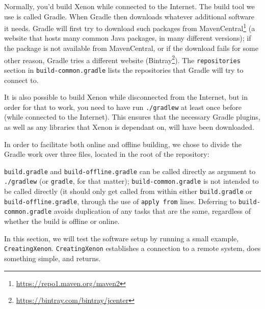 
Normally, you'd build Xenon while connected to the Internet. The build tool we use is called Gradle. When  Gradle then downloads whatever additional software it needs. Gradle will first try to download such packages from MavenCentral\footnote{\url{https://repo1.maven.org/maven2}} (a website that hosts many common Java packages, in many different versions); if the package is not available from MavenCentral, or if the download fails for some other reason, Gradle tries a different website (Bintray\footnote{\url{https://bintray.com/bintray/jcenter}}). The \texttt{repositories} section in \texttt{build-common.gradle} lists the repositories that Gradle will try to connect to.


It is also possible to build Xenon while disconnected from the Internet, but in order for that to work, you need to have run \texttt{./gradlew} at least once before (while connected to the Internet). This ensures that the necessary Gradle plugins, as well as any libraries that Xenon is dependant on, will have been downloaded.

In order to facilitate both online and offline building, we chose to divide the Gradle work over three files, located in the root of the repository:
\begin{enumerate}
\item{\texttt{build.gradle} }
\item{\texttt{build-offline.gradle}} }
\item{\texttt{build-common.gradle}} \index{Xenon!Gradle!build-common.gradle@\texttt{build-common.gradle}}}
\end{enumerate}

\texttt{build.gradle} and \texttt{build-offline.gradle} can be called directly as argument to \texttt{./gradlew} (or \texttt{gradle}, for that matter); \texttt{build-common.gradle} is not intended to be called directly (it should only get called from within either \texttt{build.gradle} or \texttt{build-offline.gradle}, through the use of \texttt{apply from} lines. Deferring to \texttt{build-common.gradle} avoids duplication of any tasks that are the same, regardless of whether the build is offline or online.




In this section, we will test the software setup by running a small example, \texttt{CreatingXenon}. \texttt{CreatingXenon} establishes a connection to a remote system, does something simple, and returns.
